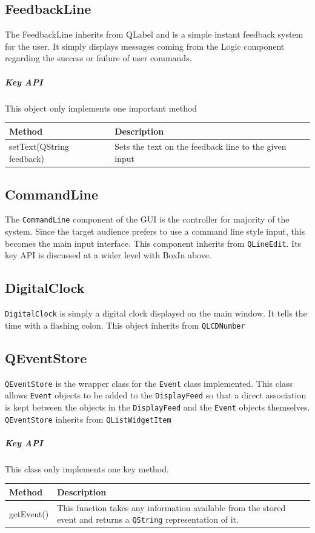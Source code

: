 \documentclass[12pt]{extarticle}
\begin{document}
\subsection{FeedbackLine}
The FeedbackLine inherits from QLabel and is a simple instant feedback system for the user. It simply displays messages coming from the Logic component regarding the success or failure of user commands.

\subparagraph{Key API} This object only implements one important method\\
\begin{tabular}{p{6cm} p{12cm}}
Method & Description\\
\hline
setText(QString feedback) & Sets the text on the feedback line to the given input\\
\end{tabular}

\subsection{CommandLine}
The \texttt{CommandLine} component of the GUI is the controller for majority of the system. Since the target audience prefers to use a command line style input, this becomes the main input interface. This component inherits from \texttt{QLineEdit}. Its key API is discussed at a wider level with BoxIn above.\\

\subsection{DigitalClock}
\texttt{DigitalClock} is simply a digital clock displayed on the main window. It tells the time with a flashing colon. This object inherits from \texttt{QLCDNumber}\\

\subsection{QEventStore}
\texttt{QEventStore} is the wrapper class for the \texttt{Event} class implemented. This class allows \texttt{Event} objects to be added to the \texttt{DisplayFeed} so that a direct association is kept between the objects in the \texttt{DisplayFeed} and the \texttt{Event} objects themselves. \texttt{QEventStore} inherits from \texttt{QListWidgetItem}

\subparagraph{Key API} This class only implements one key method.\\
\begin{tabular}{p{6cm} p{12cm}}
Method & Description\\
\hline
getEvent() & This function takes any information available from the stored event and returns a \texttt{QString} representation of it.
\end{tabular}
\end{document}
